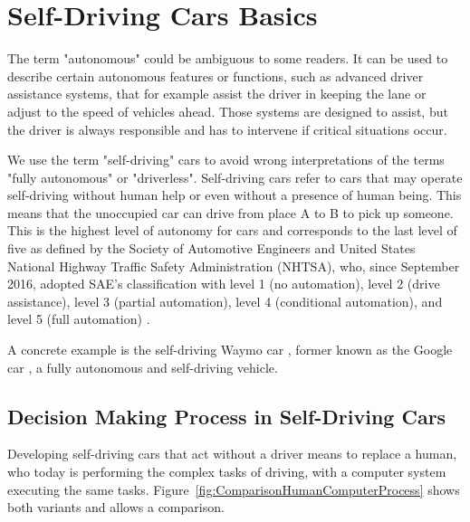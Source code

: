 \section{Self-Driving Cars Basics}
\label{sec:SelfDrivingCarsBasics}

The term "autonomous" could be ambiguous to some readers. It can be used to describe certain autonomous features or functions, such as advanced driver assistance systems, that for example assist the driver in keeping the lane or adjust to the speed of vehicles ahead. Those systems are designed to assist, but the driver is always responsible and has to intervene if critical situations occur. 

We use the term "self-driving" cars to avoid wrong interpretations of the terms "fully autonomous" or "driverless". Self-driving cars refer to cars that may operate self-driving without human help or even without a presence of human being. This means that the unoccupied car can drive from place A to B to pick up someone. This is the highest level of autonomy for cars and corresponds to the last level of five as defined by the Society of Automotive Engineers \cite{SAE2016} and United States National Highway Traffic Safety Administration (NHTSA), who, since September 2016, adopted SAE's classification with level 1 (no automation), level 2 (drive assistance), level 3 (partial automation), level 4 (conditional automation), and level 5 (full automation) \cite[p.9]{NationalHighwayTrafficSafetyAdministrationNHTSA2016}.

A concrete example is the self-driving Waymo car \cite{Waymo2017}, former known as the Google car \cite{Google2016}, a fully autonomous and self-driving vehicle. 


\subsection{Decision Making Process in Self-Driving Cars}
\label{sec:SelfDrivingCarsBasics:DecisionMakingProcess}

Developing self-driving cars that act without a driver means to replace a human, who today is performing the complex tasks of driving, with a computer system executing the same tasks. Figure~\ref{fig:ComparisonHumanComputerProcess} shows both variants and allows a comparison. 

